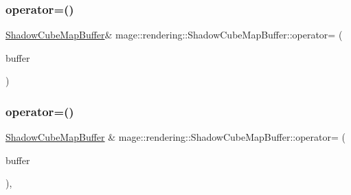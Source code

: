 \hypertarget{classmage_1_1rendering_1_1_shadow_cube_map_buffer_a25b59803df1595c97b452dd91c661854}{}\label{classmage_1_1rendering_1_1_shadow_cube_map_buffer_a25b59803df1595c97b452dd91c661854} 
\subsubsection{\texorpdfstring{operator=()}{operator=()}\hspace{0.1cm}{\footnotesize\ttfamily [1/2]}}
{\footnotesize\ttfamily \hyperlink{classmage_1_1rendering_1_1_shadow_cube_map_buffer}{Shadow\+Cube\+Map\+Buffer}\& mage\+::rendering\+::\+Shadow\+Cube\+Map\+Buffer\+::operator= (\begin{DoxyParamCaption}\item[{const \hyperlink{classmage_1_1rendering_1_1_shadow_cube_map_buffer}{Shadow\+Cube\+Map\+Buffer} \&}]{buffer }\end{DoxyParamCaption})\hspace{0.3cm}{\ttfamily [delete]}}

\hypertarget{classmage_1_1rendering_1_1_shadow_cube_map_buffer_a5eb775fdc0f94c220b0115f2695ef18b}{}\label{classmage_1_1rendering_1_1_shadow_cube_map_buffer_a5eb775fdc0f94c220b0115f2695ef18b} 
\subsubsection{\texorpdfstring{operator=()}{operator=()}\hspace{0.1cm}{\footnotesize\ttfamily [2/2]}}
{\footnotesize\ttfamily \hyperlink{classmage_1_1rendering_1_1_shadow_cube_map_buffer}{Shadow\+Cube\+Map\+Buffer} \& mage\+::rendering\+::\+Shadow\+Cube\+Map\+Buffer\+::operator= (\begin{DoxyParamCaption}\item[{\hyperlink{classmage_1_1rendering_1_1_shadow_cube_map_buffer}{Shadow\+Cube\+Map\+Buffer} \&\&}]{buffer }\end{DoxyParamCaption})\hspace{0.3cm}{\ttfamily [default]}, {\ttfamily [noexcept]}}

